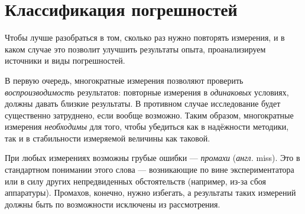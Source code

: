 %


\section{Классификация погрешностей}

Чтобы лучше разобраться в том, сколько раз нужно повторять измерения,
и в каком случае это позволит улучшить результаты опыта,
проанализируем источники и виды погрешностей.

В первую очередь, многократные измерения позволяют проверить
\emph{воспроизводимость} результатов: повторные измерения в \emph{одинаковых}
условиях, должны давать близкие результаты. В противном случае
исследование будет существенно затруднено, если вообще возможно.
Таким образом, многократные измерения \emph{необходимы} для того,
чтобы убедиться как в надёжности методики, так и в стабильности измеряемой
величины как таковой.

При любых измерениях возможны грубые ошибки --- \emph{промахи}
(\emph{англ.} miss). Это  в стандартном
понимании этого слова --- возникающие по вине экспериментатора
или в силу других непредвиденных обстоятельств (например, из-за сбоя
аппаратуры). Промахов, конечно, нужно избегать, а результаты таких
измерений должны быть по возможности исключены из рассмотрения.


